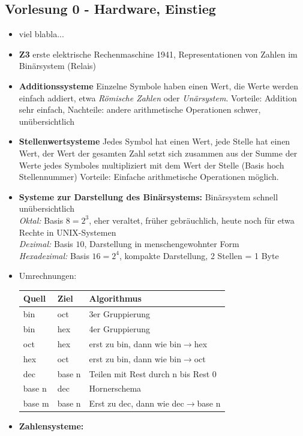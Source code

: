 \subsection*{Vorlesung 0 - Hardware, Einstieg}
 \begin{itemize}
 \item viel blabla...
 \item \textbf{Z3} erste elektrische Rechenmaschine 1941, Representationen von Zahlen im Binärsystem (Relais)
 \item \textbf{Additionssysteme} Einzelne Symbole haben einen Wert, die Werte werden einfach addiert, etwa \emph{Römische Zahlen} oder \emph{Unärsystem}. Vorteile: Addition sehr einfach, Nachteile: andere arithmetische Operationen schwer, unübersichtlich
 \item \textbf{Stellenwertsysteme} Jedes Symbol hat einen Wert, jede Stelle hat einen Wert, der Wert der gesamten Zahl setzt sich zusammen aus der Summe der Werte jedes Symboles multipliziert mit dem Wert der Stelle (Basis hoch Stellennummer) Vorteile: Einfache arithmetische Operationen möglich.
 \item \textbf{Systeme zur Darstellung des Binärsystems:} Binärsystem schnell unübersichtlich \\
  \emph{Oktal:} Basis $8=2^3$, eher veraltet, früher gebräuchlich, heute noch für etwa Rechte in UNIX-Systemen\\
  \emph{Dezimal:} Basis $10$, Darstellung in menschengewohnter Form \\
  \emph{Hexadezimal:} Basis $16=2^4$, kompakte Darstellung, 2 Stellen = 1 Byte
 \item Umrechnungen: \\
  \begin{tabular}{|l|l|l|}
  \hline Quell & Ziel & Algorithmus \\
  \hline 
  \hline bin & oct & 3er Gruppierung \\
  \hline bin & hex & 4er Gruppierung \\
  \hline oct & hex & erst zu bin, dann wie bin$\to$hex \\
  \hline hex & oct & erst zu bin, dann wie bin$\to$oct \\
  \hline dec & base n & Teilen mit Rest durch n bis Rest 0 \\
  \hline base n & dec & Hornerschema \\
  \hline base m & base n & Erst zu dec, dann wie dec$\to$base n \\
  \hline \end{tabular}
 \item \textbf{Zahlensysteme:} \\

\end{itemize}
